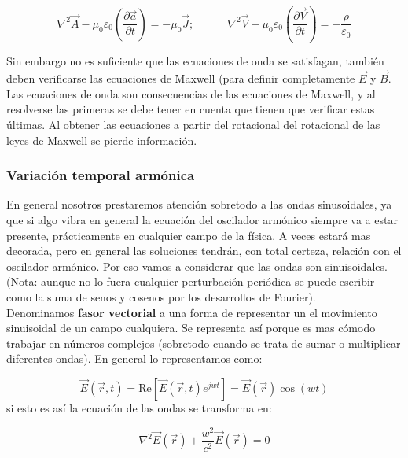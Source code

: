 \documentclass[12pt]{article}
\newcommand{\parentesis}[1]{\left( #1  \right)}
\newcommand{\parciales}[2]{\frac{\partial #1}{\partial #2}}
\newcommand{\pparciales}[2]{\parentesis{\parciales{#1}{#2}}}
\newcommand{\tquad}{\quad \quad \quad}
\begin{document}
\begin{equation}
\nabla^2 \vec{A} -  \mu_0 \varepsilon_0 \pparciales{\vec{a}}{t}  = - \mu_0 \vec{J}; \tquad 
\nabla^2 \vec{V} -  \mu_0 \varepsilon_0 \pparciales{\vec{V}}{t}  = - \dfrac{\rho}{\varepsilon_0}
\end{equation} 

Sin embargo no es suficiente que las ecuaciones de onda se satisfagan, también deben verificarse las ecuaciones de Maxwell (para definir completamente $\vec{E}$ y $\vec{B}$. Las ecuaciones de onda son consecuencias de las ecuaciones de Maxwell, y al resolverse las primeras se debe tener en cuenta que tienen que verificar estas últimas. Al obtener las ecuaciones a partir del rotacional del rotacional de las leyes de Maxwell se pierde información.







\subsubsection{Variación temporal armónica}
En general nosotros prestaremos atención sobretodo a las ondas sinusoidales, ya que si algo vibra en general la ecuación del oscilador armónico siempre va a estar presente, prácticamente en cualquier campo de la física. A veces estará mas decorada, pero en general las soluciones tendrán, con total certeza, relación con el oscilador armónico. Por eso vamos a considerar que las ondas son sinuisoidales. (Nota: aunque no lo fuera cualquier perturbación periódica se puede escribir como la suma de senos y cosenos por los desarrollos de Fourier).\\

Denominamos \textbf{fasor vectorial} a una forma de representar un el movimiento sinuisoidal de un campo cualquiera. Se representa así porque es mas cómodo trabajar en números complejos (sobretodo cuando se trata de sumar o multiplicar diferentes ondas). En general lo representamos como:

\begin{equation}
\vec{E} (\vec{r},t) = \mathrm{Re} \left[ \vec{E} (\vec{r},t) e^{jwt} \right] = \vec{E} (\vec{r}) \cos (wt)
\end{equation}
si esto es así la ecuación de las ondas se transforma en:

\begin{equation}
\nabla^2 \vec{E} (\vec{r}) + \dfrac{w^2}{c^2} \vec{E} (\vec{r}) = 0
\end{equation}
\end{document}
